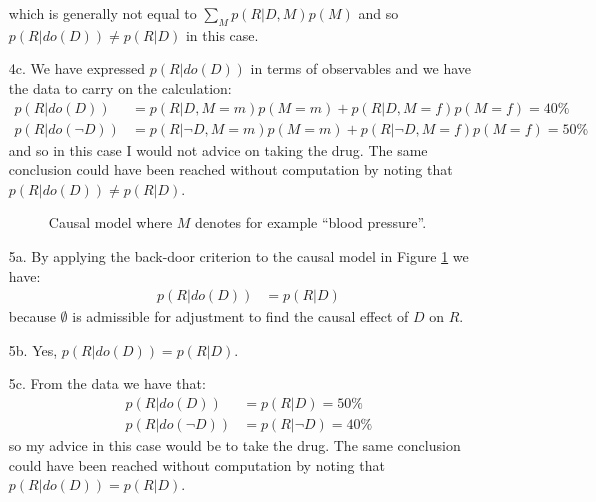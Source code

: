 \documentclass{amsmlaj}
\begin{document}
\begin{sol}
\begin{itemize}
			which is generally not equal to $\sum_Mp(R|D,M)p(M)$ and so
			$p(R|do(D)) \neq p(R|D)$ in this case.
		\item[4c.] We have expressed $p(R|do(D))$ in terms of observables and we
			have the data to carry on the calculation:
			\begin{align}
				p(R|do(D)) &= p(R|D,M=m)p(M=m) + p(R|D,M=f)p(M=f) = 40\% \\
				p(R|do(\neg D)) &= p(R|\neg D,M=m)p(M=m) + p(R|\neg D,M=f)p(M=f) = 50\%
			\end{align}
			and so in this case I would not advice on taking the drug. The same
			conclusion could have been reached without computation by noting that
			$p(R|do(D)) \neq p(R|D)$.
		\begin{figure}[h]
			\centering
			\caption{Causal model where $M$ denotes for example ``blood pressure''.}
			\label{fig:p3ii}
		\end{figure}
		\item[5a.] By applying the back-door criterion to the causal model in Figure
			\ref{fig:p3ii} we have:
			\begin{align}
				p(R|do(D)) &= p(R|D)
			\end{align}
			because $\emptyset$ is admissible for adjustment to find the causal effect of $D$ on $R$.
		\item[5b.] Yes, $p(R|do(D)) = p(R|D)$.
		\item[5c.] From the data we have that:
			\begin{align}
				p(R|do(D)) &= p(R|D) = 50\% \\
				p(R|do(\neg D)) &= p(R|\neg D) = 40\%
			\end{align}
			so my advice in this case would be to take the drug. The same conclusion
			could have been reached without computation by noting that $p(R|do(D)) = p(R|D)$.
		\begin{figure}[h]
			\centering
\end{figure}
\end{itemize}
\end{sol}
\end{document}

